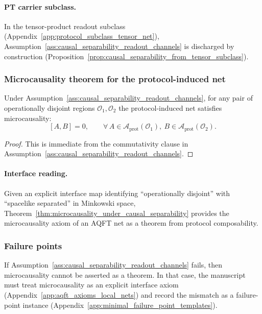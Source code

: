 \paragraph{PT carrier subclass.}
\AuditTag In the tensor-product readout subclass (Appendix~\ref{app:protocol_subclass_tensor_net}), Assumption~\ref{ass:causal_separability_readout_channels} is discharged by construction (Proposition~\ref{prop:causal_separability_from_tensor_subclass}).

\subsubsection{Microcausality theorem for the protocol-induced net}
\begin{theorem}
\label{thm:microcausality_under_causal_separability}
\MathTag Under Assumption~\ref{ass:causal_separability_readout_channels}, for any pair of operationally disjoint regions $\mathcal{O}_1,\mathcal{O}_2$ the protocol-induced net satisfies microcausality:
\[
[A,B]=0,\qquad \forall\,A\in\mathcal{A}_{\mathrm{prot}}(\mathcal{O}_1),\ B\in\mathcal{A}_{\mathrm{prot}}(\mathcal{O}_2).
\]
\end{theorem}
\begin{proof}
This is immediate from the commutativity clause in Assumption~\ref{ass:causal_separability_readout_channels}.
\end{proof}

\paragraph{Interface reading.}
\InterfaceTag Given an explicit interface map identifying ``operationally disjoint'' with ``spacelike separated'' in Minkowski space, Theorem~\ref{thm:microcausality_under_causal_separability} provides the microcausality axiom of an AQFT net as a theorem from protocol composability.

\subsubsection{Failure points}
\AuditTag If Assumption~\ref{ass:causal_separability_readout_channels} fails, then microcausality cannot be asserted as a theorem.
In that case, the manuscript must treat microcausality as an explicit interface axiom (Appendix~\ref{app:aqft_axioms_local_nets}) and record the mismatch as a failure-point instance (Appendix~\ref{app:minimal_failure_point_templates}).

